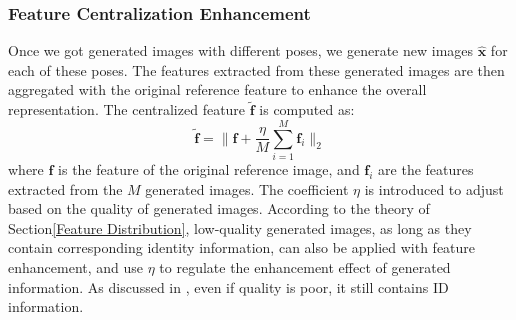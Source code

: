 

\subsubsection{Feature Centralization Enhancement}
Once we got generated images with different poses, we generate new images \( \hat{\mathbf{x}} \) for each of these poses. The features extracted from these generated images are then aggregated with the original reference feature to enhance the overall representation. The centralized feature \(\tilde{\mathbf{f}}\) is computed as:
\begin{equation}
\tilde{\mathbf{f}}  = \|\mathbf{f} + \frac{\eta}{M} \sum_{i=1}^{M} \mathbf{f}_{i}\|_2
\end{equation}
where \( \mathbf{f}\) is the feature of the original reference image, and \( \mathbf{f}_{i} \) are the features extracted from the \( M \) generated images. The coefficient \( \eta \) is introduced to adjust based on the quality of generated images. According to the theory of Section\ref{Feature Distribution}, low-quality generated images, as long as they contain corresponding identity information, can also be applied with feature enhancement, and use \( \eta \) to regulate the enhancement effect of generated information. As discussed in \cite{zheng2017unlabeled}, even if quality is poor, it still contains ID information.

